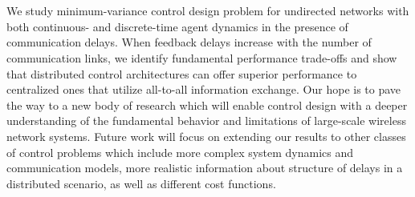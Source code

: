 
\section{}\label{sec:conclusion}

{We study minimum-variance control design problem for undirected networks with both 
continuous- and discrete-time agent dynamics in the presence of communication delays.
When feedback delays increase with the number of communication links, 
we identify fundamental performance trade-offs and
show that distributed control architectures can offer superior performance to centralized ones that utilize all-to-all information exchange.
Our hope is to pave the way to a new body of research which will
enable control design with a deeper understanding of the fundamental behavior and limitations of large-scale wireless network systems.
Future work will focus on extending our results to other classes of control 
problems which include more complex system dynamics and communication models, 
more realistic information about structure of delays in a distributed scenario, 
as well as different cost functions.}
